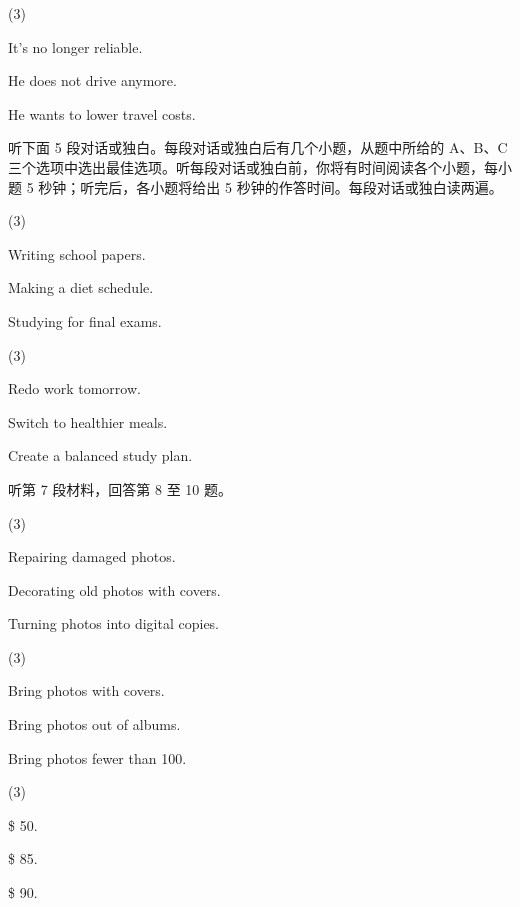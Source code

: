 \documentclass{英语试卷}
\begin{document}
\begin{choices}(3)
  \item It's no longer reliable.
  \item He does not drive anymore.
  \item He wants to lower travel costs.
\end{choices}
\par 听下面 5 段对话或独白。每段对话或独白后有几个小题，从题中所给的 A、B、C 三个选项中选出最佳选项。听每段对话或独白前，你将有时间阅读各个小题，每小题 5 秒钟；听完后，各小题将给出 5 秒钟的作答时间。每段对话或独白读两遍。\par
{}
\begin{choices}(3)
  \item Writing school papers.
  \item Making a diet schedule.
  \item Studying for final exams.
\end{choices}
\begin{choices}(3)
  \item Redo work tomorrow.
  \item Switch to healthier meals.
  \item Create a balanced study plan.
\end{choices}
\par 听第 7 段材料，回答第 8 至 10 题。\par
{}
\begin{choices}(3)
  \item Repairing damaged photos.
  \item Decorating old photos with covers.
  \item Turning photos into digital copies.
\end{choices}
\begin{choices}(3)
  \item Bring photos with covers.
  \item Bring photos out of albums.
  \item Bring photos fewer than 100.
\end{choices}
\begin{choices}(3)
  \item \$ 50.
  \item \$ 85.
  \item \$ 90.
\end{choices}
\end{document}
